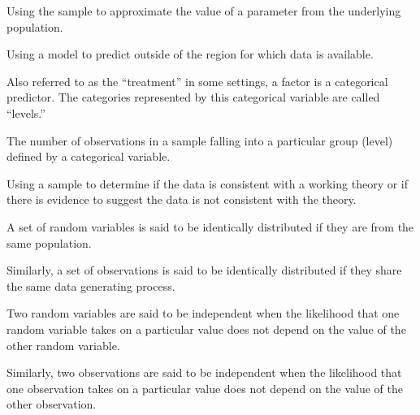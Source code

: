 \documentclass[
  letterpaper,
  DIV=11,
  numbers=noendperiod]{scrreprt}
\providecommand{\tightlist}{%
  \setlength{\itemsep}{0pt}\setlength{\parskip}{0pt}}\usepackage{longtable,booktabs,array}
\theoremstyle{plain}
\theoremstyle{definition}
\theoremstyle{definition}
\theoremstyle{remark}
\begin{document}
\begin{description}
\tightlist
\item[Estimation (Definition~\ref{def-estimation})]
Using the sample to approximate the value of a parameter from the
underlying population.
\item[Extrapolation (Definition~\ref{def-extrapolation})]
Using a model to predict outside of the region for which data is
available.
\item[Factor (Definition~\ref{def-factor})]
Also referred to as the ``treatment'' in some settings, a factor is a
categorical predictor. The categories represented by this categorical
variable are called ``levels.''
\item[Frequency (Definition~\ref{def-frequency})]
The number of observations in a sample falling into a particular group
(level) defined by a categorical variable.
\item[Hypothesis Testing (Definition~\ref{def-hypothesis-testing})]
Using a sample to determine if the data is consistent with a working
theory or if there is evidence to suggest the data is not consistent
with the theory.
\item[Identically Distributed
(Definition~\ref{def-identically-distributed})]
A set of random variables is said to be identically distributed if they
are from the same population.
\end{description}

Similarly, a set of observations is said to be identically distributed
if they share the same data generating process.

\begin{description}
\tightlist
\item[Independence (Definition~\ref{def-independence})]
Two random variables are said to be independent when the likelihood that
one random variable takes on a particular value does not depend on the
value of the other random variable.
\end{description}

Similarly, two observations are said to be independent when the
likelihood that one observation takes on a particular value does not
depend on the value of the other observation.
\end{document}
